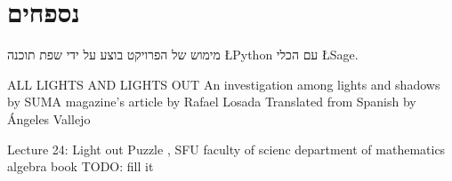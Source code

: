\documentclass[12pt,twoside]{article}
\begin{document}
\newpage
\section{נספחים}
מימוש של הפרויקט בוצע על ידי 
שפת תוכנה 
\L{Python}
עם הכלי 
\L{Sage}.

\unsethebrew

\sethebrew
\newpage
\begin{thebibliography}{99}
\unsethebrew
{} ALL LIGHTS AND LIGHTS OUT
An investigation among lights and shadows by
SUMA magazine’s article by Rafael Losada
Translated from Spanish by Ángeles Vallejo

 Lecture 24: Light out Puzzle , SFU faculty of scienc department of mathematics
 algebra book TODO: fill it
\end{thebibliography}
\end{document}
